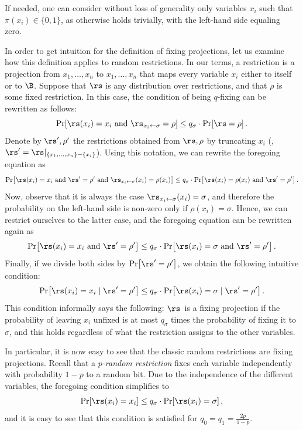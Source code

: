 \documentclass{toc}
\begin{document}
If needed, one can consider without loss of generality only variables
$x_{i}$ such that $\pi(x_{i})\in\{0,1\}$, as otherwise 
holds trivially, with the left-hand side equaling zero.
\begin{example}
In order to get intuition for the definition of fixing projections,
let us examine how this definition applies to random restrictions.
In our terms, a restriction is a projection from $x_{1},\ldots,x_{n}$
to $x_{1},\ldots,x_{n}$ that maps every variable $x_{i}$ either
to itself or to $\B$. Suppose that $\rs$ is any distribution over
restrictions, and that $\rho$ is some fixed restriction. In this
case, the condition of being $q$-fixing can be rewritten as follows:
\[
\Pr\!\left[\rs(x_{i})=x_{i}\text{ and }\rs_{x_{i}\gets\sigma}=\rho\right]\le q_{\sigma}\cdot\Pr\!\left[\rs=\rho\right].
\]
Denote by $\rs',\rho'$ the restrictions obtained from $\rs,\rho$
by truncating $x_{i}$ (\ie, $\rs'=\rs|_{\left\{ x_{1},\ldots,x_{n}\right\} -\left\{ x_{i}\right\} }$).
Using this notation, we can rewrite the foregoing equation as 
\[
\Pr\!\left[\rs(x_{i})=x_{i}\text{ and }\rs'=\rho'\text{ and }\rs_{x_{i}\gets\sigma}(x_{i})=\rho(x_{i})\right]\le q_{\sigma}\cdot\Pr\!\left[\rs(x_{i})=\rho(x_{i})\text{ and }\rs'=\rho'\right].
\]
Now, observe that it is always the case $\rs_{x_{i}\gets\sigma}(x_{i})=\sigma$,
and therefore the probability on the left-hand side is non-zero only
if $\rho(x_{i})=\sigma$. Hence, we can restrict ourselves to the
latter case, and the foregoing equation can be rewritten again as
\[
\Pr\!\left[\rs(x_{i})=x_{i}\text{ and }\rs'=\rho'\right]\le q_{\sigma}\cdot\Pr\!\left[\rs(x_{i})=\sigma\text{ and }\rs'=\rho'\right].
\]
Finally, if we divide both sides by $\Pr\!\left[\rs'=\rho'\right]$,
we obtain the following intuitive condition: 
\[
\Pr\!\left[\rs(x_{i})=x_{i}\mid\rs'=\rho'\right]\le q_{\sigma}\cdot\Pr\!\left[\rs(x_{i})=\sigma\mid\rs'=\rho'\right].
\]
This condition informally says the following: $\rs$~is a fixing
projection if the probability of leaving $x_{i}$ unfixed is at most
$q_{\sigma}$ times the probability of fixing it to $\sigma$, and
this holds regardless of what the restriction assigns to the other
variables.

In particular, it is now easy to see that the classic random restrictions
are fixing projections. Recall that a $p$\emph{-random restriction}
fixes each variable independently with probability $1-p$ to a random
bit. Due to the independence of the different variables, the foregoing
condition simplifies to 
\[
\Pr\!\left[\rs(x_{i})=x_{i}\right]\le q_{\sigma}\cdot\Pr\!\left[\rs(x_{i})=\sigma\right],
\]
and it is easy to see that this condition is satisfied for $q_{0}=q_{1}=\frac{2p}{1-p}$. 
\end{example}
\end{document}
